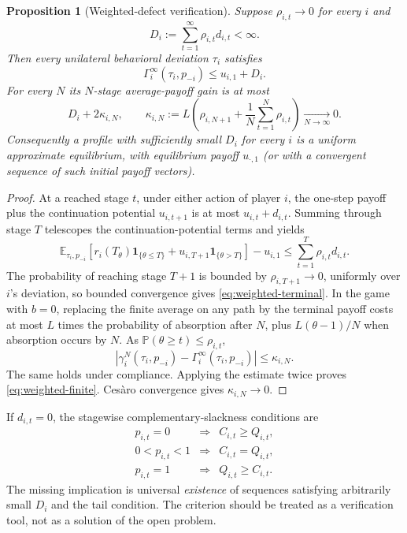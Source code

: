 \documentclass[11pt,a4paper]{article}
\newtheorem{proposition}[theorem]{Proposition}
\theoremstyle{definition}
\theoremstyle{remark}
\newcommand{\E}{\mathbb{E}}
\newcommand{\Prb}{\mathbb{P}}
\newcommand{\one}{\mathbf{1}}
\begin{document}
\begin{proposition}[Weighted-defect verification]\label{prop:weighted}
Suppose $\rho_{i,t}\to0$ for every $i$ and
\[
D_i:=\sum_{t=1}^\infty\rho_{i,t}d_{i,t}<\infty.
\]
Then every unilateral behavioral deviation $\tau_i$ satisfies
\begin{equation}\label{eq:weighted-terminal}
\Gamma_i^\infty(\tau_i,p_{-i})\le u_{i,1}+D_i.
\end{equation}
For every $N$ its $N$-stage average-payoff gain is at most
\begin{equation}\label{eq:weighted-finite}
D_i+2\kappa_{i,N},\qquad
\kappa_{i,N}:=L\left(\rho_{i,N+1}+\frac1N\sum_{t=1}^N\rho_{i,t}\right)\xrightarrow[N\to\infty]{}0.
\end{equation}
Consequently a profile with sufficiently small $D_i$ for every $i$ is a uniform approximate equilibrium, with equilibrium payoff $u_{\cdot,1}$ (or with a convergent sequence of such initial payoff vectors).
\end{proposition}
\begin{proof}
At a reached stage $t$, under either action of player $i$, the one-step payoff plus the continuation potential $u_{i,t+1}$ is at most $u_{i,t}+d_{i,t}$. Summing through stage $T$ telescopes the continuation-potential terms and yields
\[
\E_{\tau_i,p_{-i}}\left[r_i(T_\theta)\one_{\{\theta\le T\}}+u_{i,T+1}\one_{\{\theta>T\}}\right]-u_{i,1}
\le\sum_{t=1}^T\rho_{i,t}d_{i,t}.
\]
The probability of reaching stage $T+1$ is bounded by $\rho_{i,T+1}\to0$, uniformly over $i$'s deviation, so bounded convergence gives \eqref{eq:weighted-terminal}. In the game with $b=0$, replacing the finite average on any path by the terminal payoff costs at most $L$ times the probability of absorption after $N$, plus $L(\theta-1)/N$ when absorption occurs by $N$. As $\Prb(\theta\ge t)\le\rho_{i,t}$,
\[
\left|\gamma_i^N(\tau_i,p_{-i})-\Gamma_i^\infty(\tau_i,p_{-i})\right|\le\kappa_{i,N}.
\]
The same holds under compliance. Applying the estimate twice proves \eqref{eq:weighted-finite}. Ces\`aro convergence gives $\kappa_{i,N}\to0$.
\end{proof}

If $d_{i,t}=0$, the stagewise complementary-slackness conditions are
\[
\begin{array}{ccl}
p_{i,t}=0&\Longrightarrow&C_{i,t}\ge Q_{i,t},\\
0<p_{i,t}<1&\Longrightarrow&C_{i,t}=Q_{i,t},\\
p_{i,t}=1&\Longrightarrow&Q_{i,t}\ge C_{i,t}.
\end{array}
\]
The missing implication is universal \emph{existence} of sequences satisfying arbitrarily small $D_i$ and the tail condition. The criterion should be treated as a verification tool, not as a solution of the open problem.
\end{document}
